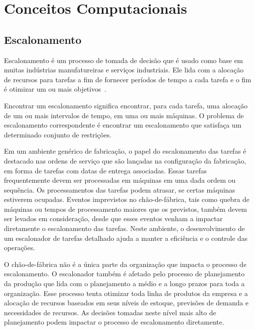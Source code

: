 \cleardoublepage
\pagestyle{fancy}


\onehalfspacing

\chapter{Conceitos Computacionais}\label{cap2}

\section{Escalonamento}\label{cap2:escalonamento}

Escalonamento é um processo de tomada de decisão que é usado como base em muitas indústrias manufatureiras e serviços industriais. Ele lida com a alocação de recursos para tarefas a fim de fornecer períodos de tempo a cada tarefa  e o fim é otimizar um ou mais objetivos~\citep{pinedo2012scheduling}.

Encontrar um escalonamento significa encontrar, para cada tarefa, uma alocação de um ou mais intervalos de tempo, em uma ou mais máquinas. O problema de escalonamento correspondente é encontrar um escalonamento que satisfaça um determinado conjunto de restrições.

Em um ambiente genérico de fabricação, o papel do escalonamento das tarefas é 
destacado nas ordens de serviço que são lançadas na configuração da fabricação,
em forma de tarefas com datas de entrega associadas. Essas tarefas 
frequentemente devem ser processadas em máquinas em uma dada ordem ou 
sequência. Os processamentos das tarefas podem atrasar, se certas máquinas 
estiverem ocupadas. Eventos imprevistos no chão-de-fábrica, tais como quebra de 
máquinas ou tempos de processamento maiores que os previstos, também devem 
ser levados em consideração, desde que esses eventos venham a impactar 
diretamente o escalonamento das tarefas. Neste ambiente, o desenvolvimento de um escalonador de tarefas detalhado ajuda a manter a eficiência e o controle das 
operações. 

O chão-de-fábrica não é a única parte da organização que impacta o 
processo de escalonamento. O escalonador também é afetado pelo processo de 
planejamento da produção que lida com o planejamento a médio e a longo prazos 
para toda a organização. Esse processo tenta otimizar toda linha de produtos da 
empresa e a alocação de recursos baseados em seus níveis de estoque, previsões 
de demanda e necessidades de recursos. As decisões tomadas neste nível mais alto 
de planejamento podem impactar o processo de escalonamento diretamente. 

